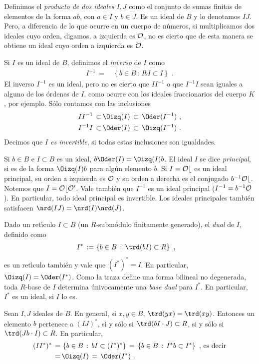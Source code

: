 Definimos el \emph{producto de dos ideales $I,J$} como el conjunto de
sumas finitas de elementos de la forma $ab$, con $a\in I$ y $b\in J$. Es
un ideal de $B$ y lo denotamos $IJ$. Pero, a diferencia de lo que ocurre en
un cuerpo de n\'{u}meros, si multiplicamos dos ideales cuyo orden, digamos,
a izquierda es $\cal{O}$, no es cierto que de esta manera se obtiene un
ideal cuyo orden a izquierda es $\cal{O}$.

Si $I$ es un ideal de $B$, definimos el \emph{inverso} de $I$ como
\begin{align*}
 I^{-1} \,=\, & \left\lbrace b\in B\,:\,
	IbI\subset I\right\rbrace
	\text{ .}
\end{align*}
%
El inverso $I^{-1}$ es un ideal, pero no es cierto que $II^{-1}$ o que
$I^{-1}I$ sean iguales a alguno de los \'{o}rdenes de $I$, como ocurre
con los ideales fraccionarios del cuerpo $K$, por ejemplo. S\'{o}lo
contamos con las inclusiones
\begin{align*}
 II^{-1}\,\subset\, & \Oizq(I)\,\subset\,\Oder(I^{-1})\text{ ,}\\
 I^{-1}I\,\subset\, & \Oder(I)\,\subset\,\Oizq(I^{-1})\text{ .}
\end{align*}
%
Decimos que \emph{$I$ es invertible}, si todas estas inclusiones son
igualdades.

Si $b\in B$ e $I\subset B$ es un ideal, $b\Oder(I)=\Oizq(I)b$. El ideal $I$
se dice \emph{principal}, si es de la forma $\Oizq(I)b$ para alg\'{u}n
elemento $b$. Si $I=\cal{O}b$ es un ideal principal, su orden a izquierda
es $\cal{O}$ y su orden a derecha es el conjugado $b^{-1}\cal{O}b$. Notemos
que $I=\cal{O}b\cal{O}'$. Vale tambi\'{e}n que $I^{-1}$ es un ideal principal
($I^{-1}=b^{-1}\cal{O}$). En particular, todo ideal principal es invertible.
Los ideales principales tambi\'{e}n satisfacen $\nrd(IJ)=\nrd(I)\nrd(J)$.

Dado un ret\'{\i}culo $I\subset B$ (un $R$-subm\'{o}dulo finitamente
generado), el \emph{dual} de $I$, definido como
\begin{align*}
	I^{*} \,:=\, & \left\lbrace b\in B\,:\,\trd(bI)\subset R\right\rbrace
	\text{ ,}
\end{align*}
%
es un ret\'{\i}culo tambi\'{e}n y vale que $(I^{*})^{*}=I$. En particular,
$\Oizq(I)=\Oder(I^{*})$.
Como la traza define una forma bilineal no degenerada, toda $R$-base de
$I$ determina \'{u}nivocamente una \emph{base dual} para $I^{*}$. En
particular, $I^{*}$ es un ideal, si $I$ lo es.

Sean $I,J$ ideales de $B$. En general, si $x,y\in B$, $\trd(yx)=\trd(xy)$.
Entonces un elemento $b$ pertenece a $(IJ)^{*}$, si y s\'{o}lo si
$\trd(bI\cdot J)\subset R$, si y s\'{o}lo si $\trd(Jb\cdot I)\subset R$.
En particular,
\begin{align*}
 (II^{*})^{*} \,=\, & \left\lbrace b\in B \,:\, bI\subset (I^{*})^{*}
	\right\rbrace
	\,=\,\left\lbrace b\in B \,:\, I^{*}b\subset I^{*}
	\right\rbrace\text{ , es decir} \\
	\,=\, & \Oizq(I)\,=\,\Oder(I^{*})%
	\text{ .}
\end{align*}
%

